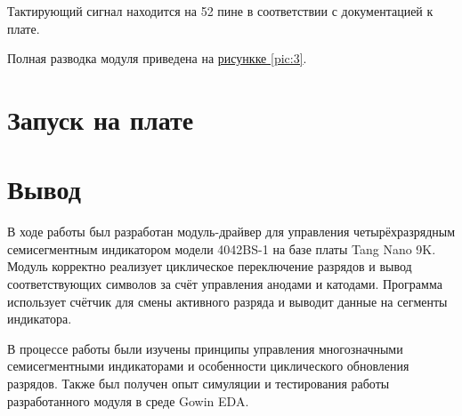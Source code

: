 
Тактирующий сигнал находится на 52 пине в соответствии с документацией к плате.

Полная разводка модуля приведена на \hyperref[pic:3]{рисункке \ref*{pic:3}}.


\section{Запуск на плате}

\newpage
\section*{Вывод}

В ходе работы был разработан модуль-драйвер для управления четырёхразрядным семисегментным индикатором модели 4042BS-1 на базе платы Tang Nano 9K. Модуль корректно реализует циклическое переключение разрядов и вывод соответствующих символов за счёт управления анодами и катодами. Программа использует счётчик для смены активного разряда и выводит данные на сегменты индикатора.

В процессе работы были изучены принципы управления многозначными семисегментными индикаторами и особенности циклического обновления разрядов. Также был получен опыт симуляции и тестирования работы разработанного модуля в среде Gowin EDA.
